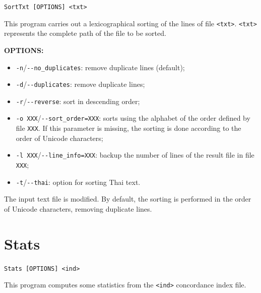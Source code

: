 \verb+SortTxt [OPTIONS] <txt>+

\bigskip
\noindent This program carries out a lexicographical sorting of the lines of file
\verb+<txt>+. \verb+<txt>+ represents the complete path of the file to be sorted.

\bigskip
\noindent \textbf{OPTIONS:}
\begin{itemize}
  \item \verb+-n+/\verb+--no_duplicates+: remove duplicate lines (default);

  \item \verb+-d+/\verb+--duplicates+: remove duplicate lines;

  \item \verb+-r+/\verb+--reverse+: sort in descending order;

  \item \verb+-o XXX+/\verb+--sort_order=XXX+: sorts using the alphabet of the
  order defined by file \verb+XXX+. If this parameter is missing, the sorting is done according to the
  order of Unicode characters;

  \item \verb+-l XXX+/\verb+--line_info=XXX+: backup the number of lines of the result file in
  file \verb+XXX+;
  
  \item \verb+-t+/\verb+--thai+: option for sorting Thai text.
\end{itemize}

\bigskip
\noindent The input text file is modified. By default,
the sorting is performed in the order of Unicode characters, removing duplicate lines.








\section{Stats}

\verb+Stats [OPTIONS] <ind>+

\bigskip
\noindent This program computes some statistics from the \verb+<ind>+
concordance index file.

